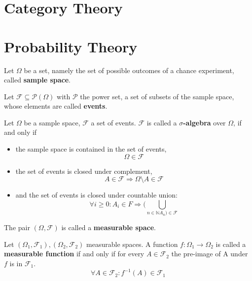             
    \section{Category Theory}
        
        \begin{definition}
        \end{definition}
        

    \section{Probability Theory}\label{\positionnumber}
        \begin{definition}
        Let $\Omega$ be a set, namely the set of possible outcomes of a chance experiment, called \textbf{sample space}.
        
        Let $\mathcal{F} \subseteq \mathcal{P}(\Omega)$ with $\mathcal{P}$ the power set, a set of subsets of the sample space, whose elements are called \textbf{events}.
        
        Let $\Omega$ be a sample space, $\mathcal{F}$ a set of events.
        $\mathcal{F}$ is called a \textbf{$\sigma$-algebra} over $\Omega$, if and only if
        \begin{itemize}
        \item the sample space is contained in the set of events,
        \[ \Omega \in \mathcal{F} \]
        \item the set of events is closed under complement,
        \[ A \in \mathcal{F} \Rightarrow \Omega \setminus A \in \mathcal F \]
        \item and the set of events is closed under countable union:
        \[ \forall i \geq 0: A_i \in F \Rightarrow (\bigcup_{n \in \mathbb{N} A_n) \in \mathcal{F}} \]
        \end{itemize}
        
        The pair $\left( \Omega, \mathcal{F} \right)$ is called a \textbf{measurable space}.

        Let $\left( \Omega_1, \mathcal{F}_1 \right), \left( \Omega_2, \mathcal{F}_2 \right)$ measurable spaces. A function $f: \Omega_1 \rightarrow \Omega_2$ is called a \textbf{measurable function} if and only if for every $A \in \mathcal{F}_2$ the pre-image of A under $f$ is in $\mathcal{F}_1$.
        \[ \forall A \in \mathcal{F}_2: f^{-1}(A) \in \mathcal{F}_1 \]
        \end{definition}

